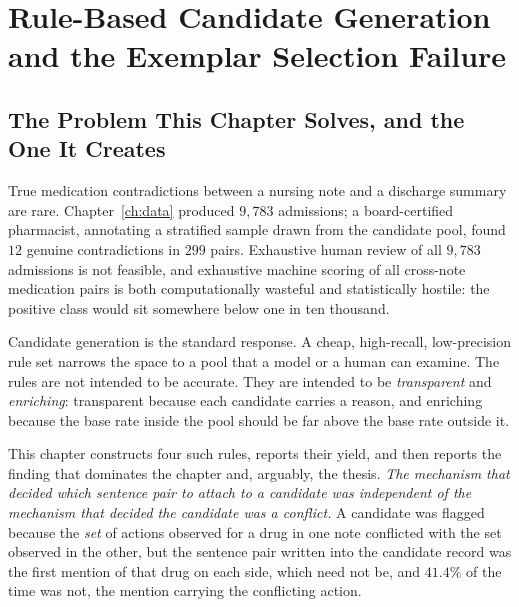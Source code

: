 %
%

\chapter{Rule-Based Candidate Generation and the Exemplar Selection Failure}
\label{ch:candidates}

\section{The Problem This Chapter Solves, and the One It Creates}
\label{sec:cand-overview}

True medication contradictions between a nursing note and a discharge summary
are rare. Chapter~\ref{ch:data} produced $9{,}783$ admissions; a board-certified
pharmacist, annotating a stratified sample drawn from the candidate pool, found
$12$ genuine contradictions in $299$ pairs. Exhaustive human review of all
$9{,}783$ admissions is not feasible, and exhaustive machine scoring of all
cross-note medication pairs is both computationally wasteful and statistically
hostile: the positive class would sit somewhere below one in ten thousand.

Candidate generation is the standard response. A cheap, high-recall,
low-precision rule set narrows the space to a pool that a model or a human can
examine. The rules are not intended to be accurate. They are intended to be
\emph{transparent} and \emph{enriching}: transparent because each candidate
carries a reason, and enriching because the base rate inside the pool should be
far above the base rate outside it.

This chapter constructs four such rules, reports their yield, and then reports
the finding that dominates the chapter and, arguably, the thesis. \emph{The
mechanism that decided which sentence pair to attach to a candidate was
independent of the mechanism that decided the candidate was a conflict.} A
candidate was flagged because the \emph{set} of actions observed for a drug in
one note conflicted with the set observed in the other, but the sentence pair
written into the candidate record was the first mention of that drug on each
side, which need not be, and $41.4\%$ of the time was not, the mention carrying
the conflicting action.


